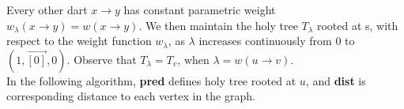 \documentclass{article}
\begin{document}
Every other dart $x \rightarrow y$ has constant parametric weight 
$w_{\lambda}(x \rightarrow y) = w(x \rightarrow y)$.
We then maintain the holy tree $T_{\lambda}$ rooted at s, with respect
to the weight function $w_{\lambda}$, as $\lambda$ increases continuously from
0 to $( 1, \vec{[0]}, 0 )$. Observe that $T_{\lambda} = T_v$, when $\lambda = w(u \rightarrow v)$. \\

In the following algorithm, \textbf{pred} defines holy tree rooted at $u$, and 
\textbf{dist} is corresponding distance to each vertex in the graph. \\

\end{document}
